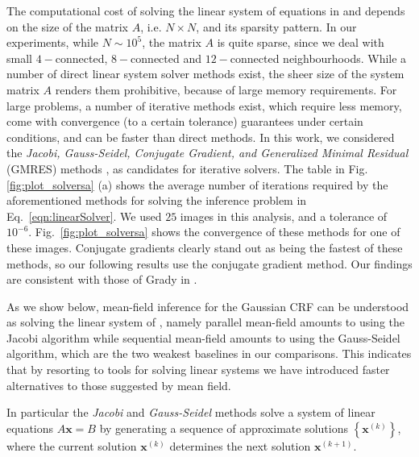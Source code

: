 \documentclass[runningheads]{llncs}
\newcommand{\mycomment}[1]{}
\begin{document}
\mycomment{
The linear system solver algorithm that we employ will directly affect the computational efficiency of the quadratic optimization formulation,
and impact its applicability to general problems, and its use in networks for a variety of tasks.
}

The computational cost of solving the linear system of equations in  and  depends on the size of the matrix $A$, i.e. $N\times N$,
and its sparsity pattern. In our experiments, while $N \sim 10^5$, the matrix $A$ is quite sparse, 
since we deal with small $4-$connected, $8-$connected and $12-$connected neighbourhoods.
While a number of direct linear system solver methods exist, the sheer size of the system matrix $A$ renders
them prohibitive, because of large memory requirements. For large problems, a number of iterative methods exist, which
require less memory, come with convergence (to a certain tolerance) guarantees under certain conditions, and can be faster than direct methods.
In this work, we considered the \emph{Jacobi, Gauss-Seidel, Conjugate Gradient, and Generalized Minimal Residual} (GMRES) methods  \cite{PressTVF92}, as candidates
for iterative solvers. The table in Fig. \ref{fig:plot_solversa} (a) shows the average number of iterations required by the aforementioned methods for solving the
inference problem in Eq.~\ref{eqn:linearSolver}. We used $25$ images in this analysis, and a tolerance of $10^{-6}$. 
Fig.~\ref{fig:plot_solversa} shows
the convergence of these methods for one of these images. 
Conjugate gradients clearly stand out as being the fastest of these methods, so our following results use the conjugate gradient method. 
Our findings are consistent with those of Grady in \cite{grady}.

As we show below, mean-field inference for the Gaussian CRF  can be understood as solving the linear system of , namely
parallel mean-field amounts to using the Jacobi algorithm while sequential mean-field amounts to 
 using the Gauss-Seidel algorithm, which are the two weakest baselines in our comparisons. 
This indicates that by resorting to tools for solving linear systems
we have introduced faster alternatives to those suggested by mean field.




In particular the \emph{Jacobi} and \emph{Gauss-Seidel} methods solve a system of linear equations $A\textbf{x} = B$
by generating a sequence of approximate solutions $\left\lbrace \textbf{x}^{(k)} \right\rbrace$,
where the current solution $\textbf{x}^{(k)}$ determines the next solution $\textbf{x}^{(k+1)}$.
\end{document}
